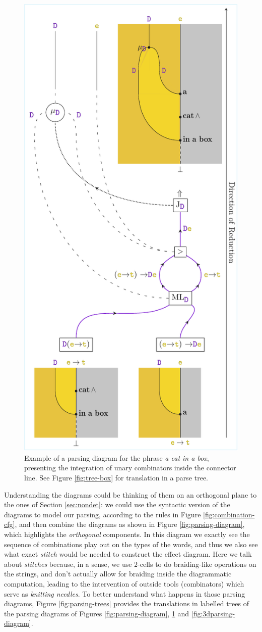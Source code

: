 \begin{figure}
	\centering
	\includegraphics[width=.45\textwidth]{parsing-diagram2.pdf}
	\caption{Example of a parsing diagram for the phrase
		\emph{a cat in a box}, presenting the integration of unary combinators
		inside the connector line. See Figure \ref{fig:tree-box} for translation in
		a parse tree.}
	\label{fig:parsing-diagram2}
\end{figure}
Understanding the diagrams could be thinking of them on an orthogonal plane to
the ones of Section \ref{sec:nondet}: we could use the syntactic version of the
diagrams to model our parsing, according to the rules in Figure
\ref{fig:combination-cfg}, and then combine the diagrams as shown in Figure
\ref{fig:parsing-diagram}, which highlights the \emph{orthogonal} components.
In this diagram we exactly see the sequence of combinations play out on the
types of the words, and thus we also see what exact \emph{stitch} would
be needed to construct the effect diagram.
Here we talk about \emph{stitches} because, in a sense, we use $2$-cells
to do braiding-like operations on the strings, and don't actually allow for
braiding inside the diagrammatic computation, leading to the intervention of
outside tools (combinators) which serve as \emph{knitting needles}.
To better understand what happens in those parsing diagrams, Figure
\ref{fig:parsing-trees} provides the translations in labelled trees of the
parsing diagrams of Figures \ref{fig:parsing-diagram},
\ref{fig:parsing-diagram2} and \ref{fig:3dparsing-diagram}.


